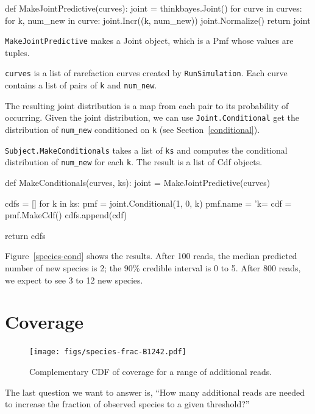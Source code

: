 \documentclass[12pt]{book}
\theoremstyle{exercise}
\begin{document}
\begin{code}
def MakeJointPredictive(curves):
    joint = thinkbayes.Joint()
    for curve in curves:
        for k, num_new in curve:
            joint.Incr((k, num_new))
    joint.Normalize()
    return joint
\end{code}

{\tt MakeJointPredictive} makes a Joint object, which is a
Pmf whose values are tuples.

{\tt curves} is a list of rarefaction curves created by
{\tt RunSimulation}.  Each curve contains a list of pairs of
{\tt k} and \verb"num_new".

The resulting joint distribution is a map from each pair to
its probability of occurring.  Given the joint distribution, we
can use {\tt Joint.Conditional}
get the distribution of \verb"num_new" conditioned on {\tt k}
(see Section~\ref{conditional}).

{\tt Subject.MakeConditionals} takes a list of {\tt ks}
and computes the conditional distribution of \verb"num_new"
for each {\tt k}.  The result is a list of Cdf objects.

\begin{code}
def MakeConditionals(curves, ks):
    joint = MakeJointPredictive(curves)

    cdfs = []
    for k in ks:
        pmf = joint.Conditional(1, 0, k)
        pmf.name = 'k=%
        cdf = pmf.MakeCdf()
        cdfs.append(cdf)

    return cdfs
\end{code}

Figure~\ref{species-cond} shows the results.  After 100 reads, the
median predicted number of new species is 2; the 90\% credible
interval is 0 to 5.  After 800 reads, we expect to see 3 to 12 new
species.


\section{Coverage}

\begin{figure}
\centerline{\texttt{[image: figs/species-frac-B1242.pdf]}}
\caption{Complementary CDF of coverage for a range of additional reads.}
\label{species-frac}
\end{figure}

The last question we want to answer is, ``How many additional reads
are needed to increase the fraction of observed species to a given
threshold?''
\end{document}
